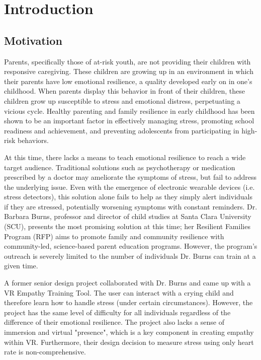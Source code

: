 \chapter{Introduction} %

\section{Motivation}

Parents, specifically those of at-risk youth, are not providing their children with responsive caregiving. 
These children are growing up in an environment in which their parents have low emotional resilience, a quality developed early on in one's childhood. 
When parents display this behavior in front of their children, these children grow up susceptible to stress and emotional distress, perpetuating a vicious cycle. 
Healthy parenting and family resilience in early childhood has been shown to be an important factor in effectively managing stress, promoting school readiness and achievement, and preventing adolescents from participating in high-risk behaviors.

At this time, there lacks a means to teach emotional resilience to reach a wide target audience. 
Traditional solutions such as psychotherapy or medication prescribed by a doctor may ameliorate the symptoms of stress, but fail to address the underlying issue. 
Even with the emergence of electronic wearable devices (i.e. stress detectors), this solution alone fails to help as they simply alert individuals if they are stressed, potentially worsening symptoms with constant reminders. 
Dr. Barbara Burns, professor and director of child studies at Santa Clara University (SCU), presents the most promising solution at this time; her Resilient Families Program (RFP) aims to promote family and community resilience with community-led, science-based parent education programs.
However, the program's outreach is severely limited to the number of individuals Dr. Burns can train at a given time. 

A former senior design project collaborated with Dr. Burns and came up with a VR Empathy Training Tool. 
The user can interact with a crying child and therefore learn how to handle stress (under certain circumstances). 
However, the project has the same level of difficulty for all individuals regardless of the difference of their emotional resilience. 
The project also lacks a sense of immersion and virtual "presence", which is a key component in creating empathy within VR. 
Furthermore, their design decision to measure stress using only heart rate is non-comprehensive.

